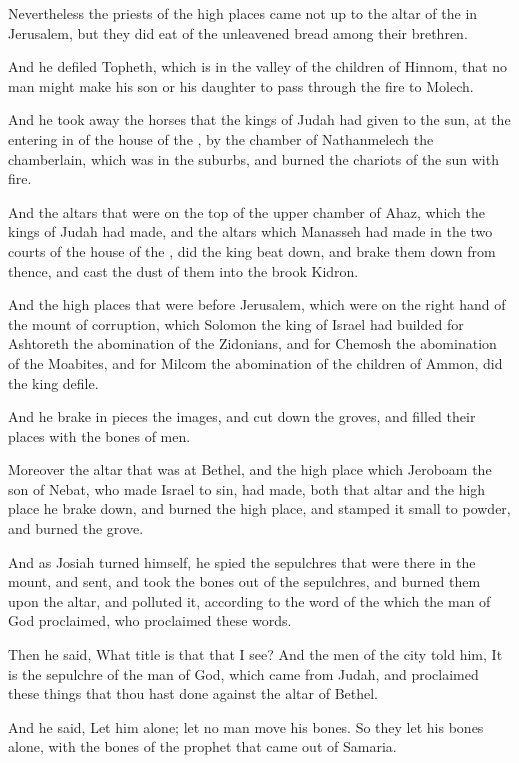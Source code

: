 \verse Nevertheless the priests of the high places came not up to the altar of the \LORD in Jerusalem, but they did eat of the unleavened bread among their brethren.

\verse And he defiled Topheth, which is in the valley of the children of Hinnom, that no man might make his son or his daughter to pass through the fire to Molech.

\verse And he took away the horses that the kings of Judah had given to the sun, at the entering in of the house of the \LORD, by the chamber of Nathanmelech the chamberlain, which was in the suburbs, and burned the chariots of the sun with fire.

\verse And the altars that were on the top of the upper chamber of Ahaz, which the kings of Judah had made, and the altars which Manasseh had made in the two courts of the house of the \LORD, did the king beat down, and brake them down from thence, and cast the dust of them into the brook Kidron.

\verse And the high places that were before Jerusalem, which were on the right hand of the mount of corruption, which Solomon the king of Israel had builded for Ashtoreth the abomination of the Zidonians, and for Chemosh the abomination of the Moabites, and for Milcom the abomination of the children of Ammon, did the king defile.

\verse And he brake in pieces the images, and cut down the groves, and filled their places with the bones of men.

\verse Moreover the altar that was at Bethel, and the high place which Jeroboam the son of Nebat, who made Israel to sin, had made, both that altar and the high place he brake down, and burned the high place, and stamped it small to powder, and burned the grove.

\verse And as Josiah turned himself, he spied the sepulchres that were there in the mount, and sent, and took the bones out of the sepulchres, and burned them upon the altar, and polluted it, according to the word of the \LORD which the man of God proclaimed, who proclaimed these words.

\verse Then he said, What title is that that I see? And the men of the city told him, It is the sepulchre of the man of God, which came from Judah, and proclaimed these things that thou hast done against the altar of Bethel.

\verse And he said, Let him alone; let no man move his bones. So they let his bones alone, with the bones of the prophet that came out of Samaria.


